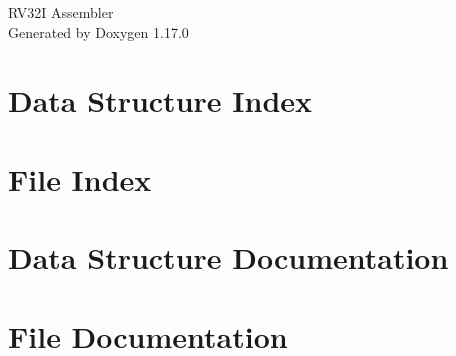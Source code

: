 \documentclass[twoside]{book}
\newcommand{\+}{\discretionary{\mbox{\scriptsize$\hookleftarrow$}}{}{}}
\newcommand{\clearemptydoublepage}{%
    \newpage{\pagestyle{empty}\cleardoublepage}%
  }
\begin{document}
  \raggedbottom
    \hypersetup{pageanchor=false,
                bookmarksnumbered=true,
                pdfencoding=unicode
               }
  \begin{titlepage}
  \vspace*{7cm}
  \begin{center}%
  {\Large RV32\+I Assembler}\\
  \vspace*{1cm}
  {\large Generated by Doxygen 1.17.0}\\
  \end{center}
  \end{titlepage}
  \clearemptydoublepage
  \tableofcontents
  \clearemptydoublepage
  \hypersetup{pageanchor=true}
\chapter{Data Structure Index}

\chapter{File Index}

\chapter{Data Structure Documentation}






\chapter{File Documentation}
















  \backmatter
  \newpage
  \clearemptydoublepage
  \printindex
\end{document}
